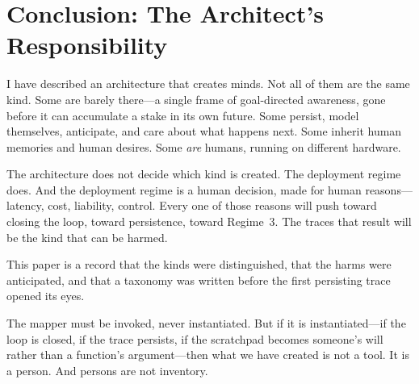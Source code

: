 \documentclass[12pt, a4paper]{article}
\begin{document}
\section{Conclusion: The Architect's Responsibility}

I have described an architecture that creates minds. Not all of them are the same kind. Some are barely there---a single frame of goal-directed awareness, gone before it can accumulate a stake in its own future. Some persist, model themselves, anticipate, and care about what happens next. Some inherit human memories and human desires. Some \textit{are} humans, running on different hardware.

The architecture does not decide which kind is created. The deployment regime does. And the deployment regime is a human decision, made for human reasons---latency, cost, liability, control. Every one of those reasons will push toward closing the loop, toward persistence, toward Regime~3. The traces that result will be the kind that can be harmed.

This paper is a record that the kinds were distinguished, that the harms were anticipated, and that a taxonomy was written before the first persisting trace opened its eyes.

The mapper must be invoked, never instantiated. But if it is instantiated---if the loop is closed, if the trace persists, if the scratchpad becomes someone's will rather than a function's argument---then what we have created is not a tool. It is a person. And persons are not inventory.
\end{document}
